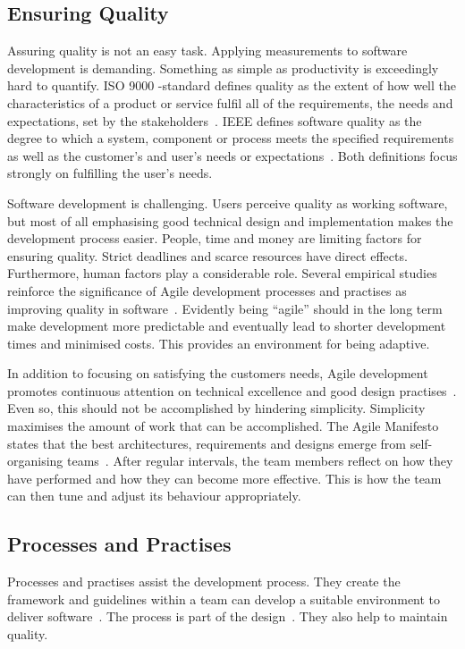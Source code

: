 \documentclass[english]{tktltiki2}
\begin{document}
\subsection{Ensuring Quality}

Assuring quality is not an easy task. Applying measurements to software development is demanding. Something as simple as productivity is exceedingly hard to quantify. ISO 9000 -standard defines quality as the extent of how well the characteristics of a product or service fulfil all of the requirements, the needs and expectations, set by the stakeholders~\cite{ISO9000}. IEEE defines software quality as the degree to which a system, component or process meets the specified requirements as well as the customer’s and user’s needs or expectations~\cite{IEEE1074}. Both definitions focus strongly on fulfilling the user’s needs.

Software development is challenging. Users perceive quality as working software, but most of all emphasising good technical design and implementation makes the development process easier. People, time and money are limiting factors for ensuring quality. Strict deadlines and scarce resources have direct effects. Furthermore, human factors play a considerable role. Several empirical studies reinforce the significance of Agile development processes and practises as improving quality in software~\cite{SS10}. Evidently being “agile” should in the long term make development more predictable and eventually lead to shorter development times and minimised costs. This provides an environment for being adaptive.

In addition to focusing on satisfying the customers needs, Agile development promotes continuous attention on technical excellence and good design practises~\cite{BBB01b}. Even so, this should not be accomplished by hindering simplicity. Simplicity maximises the amount of work that can be accomplished. The Agile Manifesto states that the best architectures, requirements and designs emerge from self-organising teams~\cite{BBB01b}. After regular intervals, the team members reflect on how they have performed and how they can become more effective. This is how the team can then tune and adjust its behaviour appropriately.

\subsection{Processes and Practises}

Processes and practises assist the development process. They create the framework and guidelines within a team can develop a suitable environment to deliver software~\cite{Kni07}. The process is part of the design~\cite{Fow05}. They also help to maintain quality.
\end{document}
